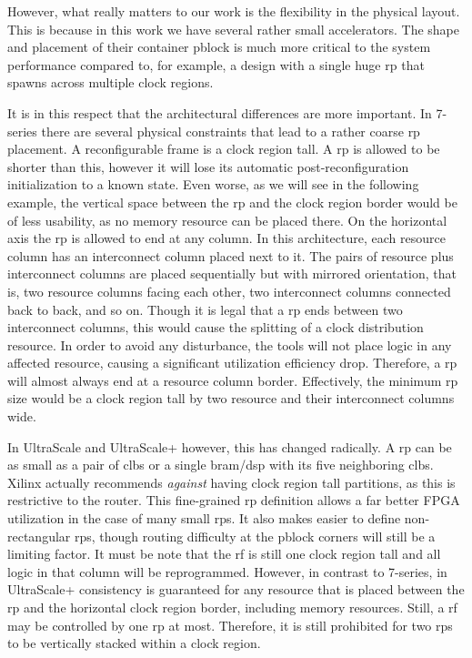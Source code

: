 However, what really matters to our work is the flexibility in the physical layout.
This is because in this work we have several rather small accelerators.
The shape and placement of their container \gls{pblock} is much more critical 
to the system performance compared to, for example, a design with a single huge
\gls{rp} that spawns across multiple clock regions.

It is in this respect that the architectural differences are more important.
In 7-series there are several physical constraints that lead to a rather
coarse \gls{rp} placement.
A reconfigurable frame is a clock region tall. 
A \gls{rp} is allowed to be shorter than this, 
however it will lose its automatic post-reconfiguration initialization to a known state.
Even worse, as we will see in the following example, 
the vertical space between the \gls{rp} and the clock region border would be of less usability,
as no memory resource can be placed there.
On the horizontal axis the \gls{rp} is allowed to end at any column. 
In this architecture, each resource column has an interconnect column placed next to it.
The pairs of resource plus interconnect columns are placed sequentially but with mirrored orientation,
that is, two resource columns facing each other, two interconnect columns connected back to back,
and so on.
Though it is legal that a \gls{rp} ends between two interconnect columns, 
this would cause the splitting of a clock distribution resource. 
In order to avoid any disturbance, the tools will not place logic in any affected resource,
causing a significant utilization efficiency drop. Therefore, a \gls{rp}
will almost always end at a resource column border. Effectively, the minimum \gls{rp}
size would be a clock region tall by two resource and their interconnect columns wide.

In UltraScale and UltraScale+ however, this has changed radically. A \gls{rp}
can be as small as a pair of \glspl{clb} or a single \gls{bram}/\gls{dsp} with
its five neighboring \glspl{clb}. Xilinx actually recommends \emph{against} having
clock region tall partitions, as this is restrictive to the router.
This fine-grained \gls{rp} definition allows
a far better FPGA utilization in the case of many small \glspl{rp}.
It also makes easier to define non-rectangular \glspl{rp}, 
though routing difficulty at the \gls{pblock} corners will still be a limiting factor. 
It must be note that the \gls{rf} is still one clock region tall and all logic in
that column will be reprogrammed. However, in contrast to 7-series, in UltraScale+
consistency is guaranteed for any resource that is placed between the \gls{rp} 
and the horizontal clock region border, including memory resources.
Still, a \gls{rf} may be controlled by one \gls{rp} at most. Therefore,
it is still prohibited for two \glspl{rp} to be vertically stacked within a clock region.

